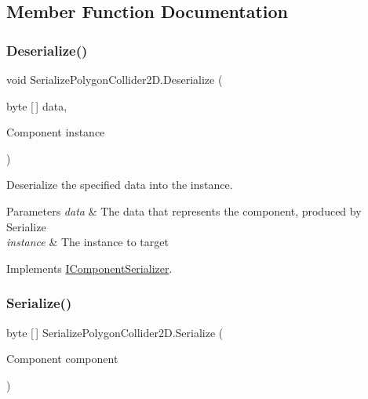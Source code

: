 \subsection{Member Function Documentation}
\mbox{\label{class_serialize_polygon_collider2_d_a91694bef6812922cf021805d76b9d7e4}} 
\subsubsection{\texorpdfstring{Deserialize()}{Deserialize()}}
{\footnotesize\ttfamily void Serialize\+Polygon\+Collider2\+D.\+Deserialize (\begin{DoxyParamCaption}\item[{byte \mbox{[}$\,$\mbox{]}}]{data,  }\item[{Component}]{instance }\end{DoxyParamCaption})\hspace{0.3cm}{\ttfamily [inline]}}



Deserialize the specified data into the instance. 


\begin{DoxyParams}{Parameters}
{\em data} & The data that represents the component, produced by Serialize \\
\hline
{\em instance} & The instance to target \\
\hline
\end{DoxyParams}


Implements \hyperlink{interface_i_component_serializer_a4cc366a5c78b33d47a90c209d8fed883}{I\+Component\+Serializer}.

\mbox{\label{class_serialize_polygon_collider2_d_a0f488a1150cc7f8786e659577a4d9488}} 
\subsubsection{\texorpdfstring{Serialize()}{Serialize()}}
{\footnotesize\ttfamily byte \mbox{[}$\,$\mbox{]} Serialize\+Polygon\+Collider2\+D.\+Serialize (\begin{DoxyParamCaption}\item[{Component}]{component }\end{DoxyParamCaption})\hspace{0.3cm}{\ttfamily [inline]}}



